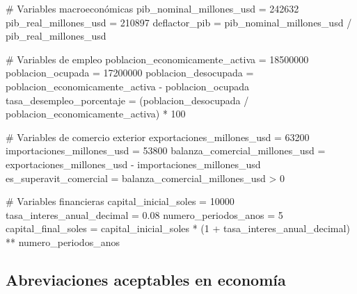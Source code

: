 \documentclass[
  doc,
  floatsintext,
  longtable,
  a4paper,
  nolmodern,
  notxfonts,
  notimes,
  12pt,
  colorlinks=true,linkcolor=blue,citecolor=blue,urlcolor=blue]{apa7}
\newenvironment{Shaded}{\begin{snugshade}}{\end{snugshade}}
\newcommand{\CommentTok}[1]{\textcolor[rgb]{0.37,0.37,0.37}{#1}}
\newcommand{\DecValTok}[1]{\textcolor[rgb]{0.68,0.00,0.00}{#1}}
\newcommand{\FloatTok}[1]{\textcolor[rgb]{0.68,0.00,0.00}{#1}}
\newcommand{\NormalTok}[1]{\textcolor[rgb]{0.00,0.23,0.31}{#1}}
\newcommand{\OperatorTok}[1]{\textcolor[rgb]{0.37,0.37,0.37}{#1}}
\begin{document}
\begin{Shaded}
\begin{Highlighting}[]
\CommentTok{\# Variables macroeconómicas}
\NormalTok{pib\_nominal\_millones\_usd }\OperatorTok{=} \DecValTok{242632}
\NormalTok{pib\_real\_millones\_usd }\OperatorTok{=} \DecValTok{210897}
\NormalTok{deflactor\_pib }\OperatorTok{=}\NormalTok{ pib\_nominal\_millones\_usd }\OperatorTok{/}\NormalTok{ pib\_real\_millones\_usd}

\CommentTok{\# Variables de empleo}
\NormalTok{poblacion\_economicamente\_activa }\OperatorTok{=} \DecValTok{18500000}
\NormalTok{poblacion\_ocupada }\OperatorTok{=} \DecValTok{17200000}
\NormalTok{poblacion\_desocupada }\OperatorTok{=}\NormalTok{ poblacion\_economicamente\_activa }\OperatorTok{{-}}\NormalTok{ poblacion\_ocupada}
\NormalTok{tasa\_desempleo\_porcentaje }\OperatorTok{=}\NormalTok{ (poblacion\_desocupada }\OperatorTok{/}\NormalTok{ poblacion\_economicamente\_activa) }\OperatorTok{*} \DecValTok{100}

\CommentTok{\# Variables de comercio exterior}
\NormalTok{exportaciones\_millones\_usd }\OperatorTok{=} \DecValTok{63200}
\NormalTok{importaciones\_millones\_usd }\OperatorTok{=} \DecValTok{53800}
\NormalTok{balanza\_comercial\_millones\_usd }\OperatorTok{=}\NormalTok{ exportaciones\_millones\_usd }\OperatorTok{{-}}\NormalTok{ importaciones\_millones\_usd}
\NormalTok{es\_superavit\_comercial }\OperatorTok{=}\NormalTok{ balanza\_comercial\_millones\_usd }\OperatorTok{\textgreater{}} \DecValTok{0}

\CommentTok{\# Variables financieras}
\NormalTok{capital\_inicial\_soles }\OperatorTok{=} \DecValTok{10000}
\NormalTok{tasa\_interes\_anual\_decimal }\OperatorTok{=} \FloatTok{0.08}
\NormalTok{numero\_periodos\_anos }\OperatorTok{=} \DecValTok{5}
\NormalTok{capital\_final\_soles }\OperatorTok{=}\NormalTok{ capital\_inicial\_soles }\OperatorTok{*}\NormalTok{ (}\DecValTok{1} \OperatorTok{+}\NormalTok{ tasa\_interes\_anual\_decimal) }\OperatorTok{**}\NormalTok{ numero\_periodos\_anos}
\end{Highlighting}
\end{Shaded}

\subsection{Abreviaciones aceptables en
economía}\label{abreviaciones-aceptables-en-economuxeda}
\end{document}
